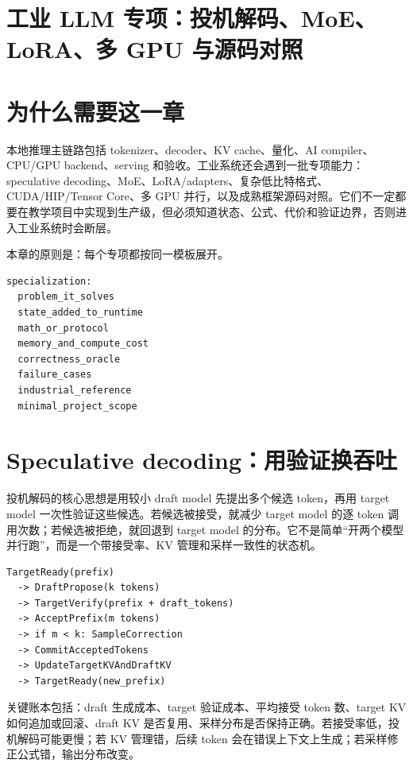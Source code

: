 \section{工业 LLM 专项：投机解码、MoE、LoRA、多 GPU 与源码对照}

\section{为什么需要这一章}

本地推理主链路包括 tokenizer、decoder、KV cache、量化、AI compiler、CPU/GPU backend、serving 和验收。工业系统还会遇到一批专项能力：speculative decoding、MoE、LoRA/adapters、复杂低比特格式、CUDA/HIP/Tensor Core、多 GPU 并行，以及成熟框架源码对照。它们不一定都要在教学项目中实现到生产级，但必须知道状态、公式、代价和验证边界，否则进入工业系统时会断层。

本章的原则是：每个专项都按同一模板展开。

\begin{lstlisting}[numbers=none,caption={工业专项分析模板}]
specialization:
  problem_it_solves
  state_added_to_runtime
  math_or_protocol
  memory_and_compute_cost
  correctness_oracle
  failure_cases
  industrial_reference
  minimal_project_scope
\end{lstlisting}

\section{Speculative decoding：用验证换吞吐}

投机解码的核心思想是用较小 draft model 先提出多个候选 token，再用 target model 一次性验证这些候选。若候选被接受，就减少 target model 的逐 token 调用次数；若候选被拒绝，就回退到 target model 的分布。它不是简单“开两个模型并行跑”，而是一个带接受率、KV 管理和采样一致性的状态机。

\begin{lstlisting}[numbers=none,caption={投机解码状态机}]
TargetReady(prefix)
  -> DraftPropose(k tokens)
  -> TargetVerify(prefix + draft_tokens)
  -> AcceptPrefix(m tokens)
  -> if m < k: SampleCorrection
  -> CommitAcceptedTokens
  -> UpdateTargetKVAndDraftKV
  -> TargetReady(new_prefix)
\end{lstlisting}

关键账本包括：draft 生成成本、target 验证成本、平均接受 token 数、target KV 如何追加或回滚、draft KV 是否复用、采样分布是否保持正确。若接受率低，投机解码可能更慢；若 KV 管理错，后续 token 会在错误上下文上生成；若采样修正公式错，输出分布改变。

